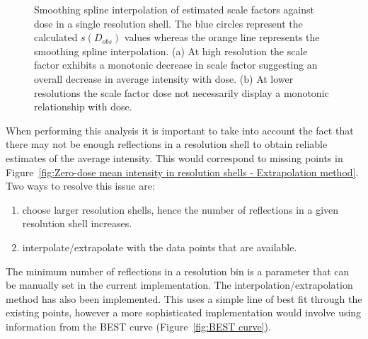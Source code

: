 \begin{figure}
\begin{subfigure}[b]{0.9\textwidth}
                \caption{}
                \label{fig:scale factor not monotonic - Extrapolation method}
        \end{subfigure}
        \caption[Smoothing spline interpolation of estimated scale factors against dose in a single resolution shell.]{Smoothing spline interpolation of estimated scale factors against dose in a single resolution shell.
        The blue circles represent the calculated $s(D_{obs})$ values whereas the orange line represents the smoothing spline interpolation.
        (a) At high resolution the scale factor exhibits a monotonic decrease in scale factor suggesting an overall decrease in average intensity with dose.
        (b) At lower resolutions the scale factor dose not necessarily display a monotonic relationship with dose.}
        \label{fig:Scale factors, smoothing interpolation - Extrapolation method}
\end{figure}

When performing this analysis it is important to take into account the fact that there may not be enough reflections in a resolution shell to obtain reliable estimates of the average intensity.
This would correspond to missing points in Figure~\ref{fig:Zero-dose mean intensity in resolution shells - Extrapolation method}.
Two ways to resolve this issue are:
\begin{enumerate}
    \item choose larger resolution shells, hence the number of reflections in a given resolution shell increases.
    \item interpolate/extrapolate with the data points that are available.
\end{enumerate}
The minimum number of reflections in a resolution bin is a parameter that can be manually set in the current implementation. The interpolation/extrapolation method has also been implemented.
This uses a simple line of best fit through the existing points, however a more sophisticated implementation would involve using information from the BEST curve (Figure~\ref{fig:BEST curve}).

